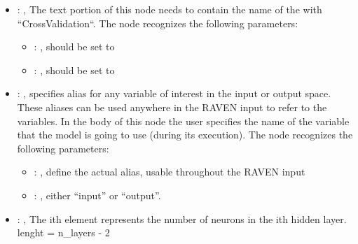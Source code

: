 \begin{itemize}
\begin{itemize}
        \item {}: ,
          List of IDs of features/variables to include in the transformation process.

        \item {}: ,
          Which space to search? Target or Feature?
      \end{itemize}

    \item {}: ,
      The text portion of this node needs to contain the name of the  with
               ``CrossValidation``.
      The  node recognizes the following parameters:
        \begin{itemize}
          \item {}: ,
            should be set to 
          \item {}: ,
            should be set to 
      \end{itemize}

    \item {}: ,
      specifies alias for         any variable of interest in the input or output space. These
      aliases can be used anywhere in the RAVEN input to         refer to the variables. In the body
      of this node the user specifies the name of the variable that the model is going to use
      (during its execution).
      The  node recognizes the following parameters:
        \begin{itemize}
          \item {}: ,
            define the actual alias, usable throughout the RAVEN input
          \item {}: ,
            either ``input'' or ``output''.
      \end{itemize}

    \item {}: ,
      The ith element represents the number of neurons in the ith hidden layer.
      lenght = n\_layers - 2


\end{itemize}
